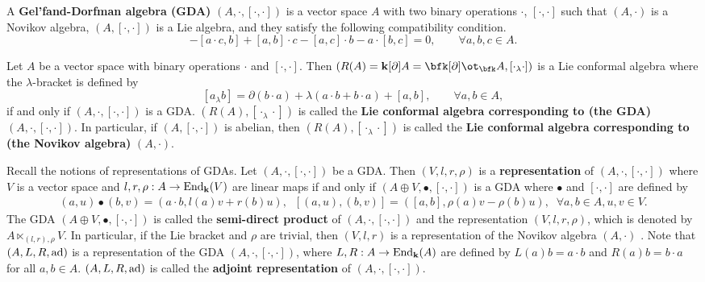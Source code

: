 \documentclass[12pt]{amsart}
\begin{document}
A {\bf Gel'fand-Dorfman algebra (GDA)} $(A,\cdot,[\cdot,\cdot])$
is a vector space $A$ with two binary operations $\cdot$,
$[\cdot,\cdot]$ such that $(A, \cdot)$ is a Novikov algebra, $(A,
[\cdot,\cdot])$  is a Lie algebra, and they satisfy the following
compatibility condition.
\begin{equation*}
    [a\cdot b,c]-[a\cdot c,b]+[a,b]\cdot c-[a,c]\cdot b-a\cdot [b,c]=0,\qquad \forall a,b,c\in A.
\end{equation*}

\begin{proposition}  \cite[Theorem 2.2]{X} \label{pp-lc-gd}
    Let $A$ be a vector space with binary operations $\cdot$ and $[\cdot,\cdot]$. Then $(R(A)={\bf k}[\partial] A=\bfk[\partial]\ot_\bfk A,[\cdot_\lambda\cdot])$ is a Lie conformal algebra where the $\lambda$-bracket is defined by
    \begin{equation}\label{eq-lc-gd}
        [a_\lambda b]=\partial(b\cdot a)+\lambda(a\cdot b+b\cdot a)+[a,b],\qquad \forall a,b\in A,
    \end{equation}
    if and only if $(A,\cdot,[\cdot,\cdot])$ is a GDA. $(R(A), [\cdot_\lambda \cdot])$ is called the {\bf Lie conformal algebra corresponding to (the GDA)}  $(A,\cdot,[\cdot,\cdot])$.
    In particular, if $(A,[\cdot,\cdot])$ is abelian, then $(R(A), [\cdot_\lambda \cdot])$  is called the {\bf Lie conformal algebra corresponding to (the Novikov algebra)} $(A,\cdot)$.
\end{proposition}

 


Recall \cite{WH} the notions of  representations of GDAs.
Let $(A, \cdot,[\cdot,\cdot])$ be a GDA.  Then $(V,l,r,\rho)$ is a
{\bf representation} of $(A, \cdot,[\cdot,\cdot])$ where $V$ is a
vector space and  $l,r,\rho: A \rightarrow {\rm End}_{\bf k} (V) $
are linear maps if and only if $(A\oplus V,\bullet
,[\cdot,\cdot])$ is a GDA where $\bullet$ and $[\cdot,\cdot]$ are
defined by
\begin{align*}
    (a,u)\bullet(b,v)=(a\cdot b,l(a)v+r(b)u),\;\; [(a,u),(b,v)]=([a,b],\rho(a)v-\rho(b)u),\;\;\forall a, b\in A, u, v\in V.
\end{align*}
 The GDA $(A\oplus V,\bullet ,[\cdot,\cdot])$  is called the {\bf semi-direct product} of $(A, \cdot,[\cdot,\cdot])$ and the representation $(V,l,r,\rho)$, which is denoted by $A\ltimes_{(l,r),\rho}V$.  In particular, if the Lie bracket and $\rho$ are trivial, then $(V,l,r)$ is a representation of the Novikov algebra $(A,\cdot)$ \cite{O}.
Note that $(A,L,R,{\rm ad} )$ is a representation of the GDA $(A,\cdot,[\cdot,\cdot])$, where $L,R :A \rightarrow {\rm End}_{\bf k} (A)$ are defined by
$L(a) b=a\cdot b$ and $ R(a)b=b\cdot a$ for all $a,b\in A$. $(A,L,R,{\rm ad} )$ is called the {\bf adjoint representation} of $(A,\cdot,[\cdot,\cdot])$.
\end{document}

